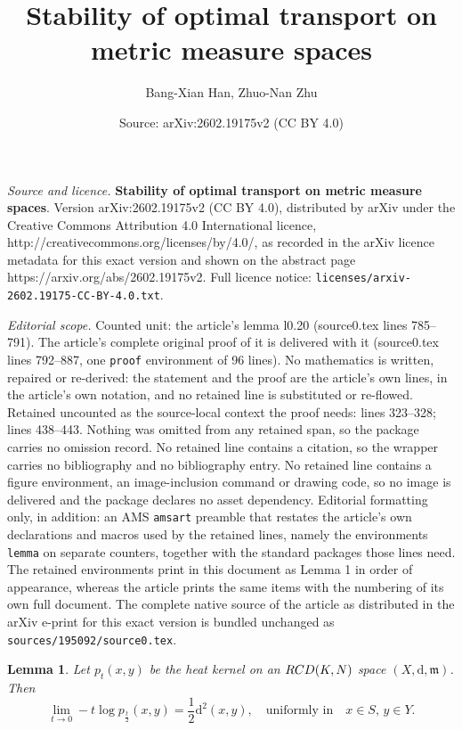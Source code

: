 \documentclass[10pt,a4paper]{amsart}
\title{{\bf Stability of optimal transport on metric measure spaces}}
\author{Bang-Xian Han, Zhuo-Nan Zhu}
\date{Source: arXiv:2602.19175v2 (CC BY 4.0)}
\newtheorem{lemma}{Lemma}
\renewcommand{\d}{{\mathrm d}}
\newcommand{\mm}{\mathfrak m}
\newcommand{\ms}{(X,\d,\mm)}
\begin{document}
\maketitle

\noindent\emph{Source and licence.} {\bf Stability of optimal transport on metric measure spaces}. Version arXiv:2602.19175v2 (CC BY 4.0), distributed by arXiv under the Creative Commons Attribution 4.0 International licence, http://creativecommons.org/licenses/by/4.0/, as recorded in the arXiv licence metadata for this exact version and shown on the abstract page https://arxiv.org/abs/2602.19175v2. Full licence notice: \texttt{licenses/arxiv-2602.19175-CC-BY-4.0.txt}.\par\smallskip

\noindent\textit{Editorial scope.} Counted unit: the article's lemma l0.20 (source0.tex lines 785--791). The article's complete original proof of it is delivered with it (source0.tex lines 792--887, one \texttt{proof} environment of 96 lines). No mathematics is written, repaired or re-derived: the statement and the proof are the article's own lines, in the article's own notation, and no retained line is substituted or re-flowed.  Retained uncounted as the source-local context the proof needs: lines 323--328; lines 438--443.  Nothing was omitted from any retained span, so the package carries no omission record.  No retained line contains a citation, so the wrapper carries no bibliography and no bibliography entry.  No retained line contains a figure environment, an image-inclusion command or drawing code, so no image is delivered and the package declares no asset dependency.  Editorial formatting only, in addition: an AMS \texttt{amsart} preamble that restates the article's own declarations and macros used by the retained lines, namely the environments \texttt{lemma} on separate counters, together with the standard packages those lines need.  The retained environments print in this document as Lemma 1 in order of appearance, whereas the article prints the same items with the numbering of its own full document.  The complete native source of the article as distributed in the arXiv e-print for this exact version is bundled unchanged as \texttt{sources/195092/source0.tex}.
	\begin{lemma}\label{lemma0.2}
		Let $p_t(x,y)$ be the heat kernel on an ${\rm RCD}(K,N)$ space $\ms$.  Then
		\begin{equation}
			\lim_{t\rightarrow 0}-t \log p_\frac{t}{2}(x,y)=\frac{1}{2}\d^2(x,y),\quad \text{uniformly in}  \quad x\in S,\, y\in Y.
		\end{equation}
	\end{lemma}
\end{document}
